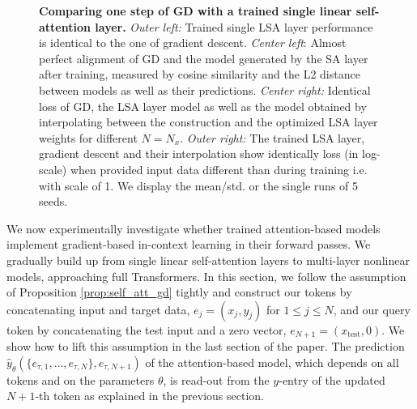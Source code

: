 \documentclass{article}
\theoremstyle{plain}
\theoremstyle{definition}
\theoremstyle{remark}
\begin{document}
\begin{figure}
\begin{minipage}{.23\textwidth}
\begin{center}
  \end{center}
  \vspace{-10pt}
\end{minipage}
\hspace{-0pt}
  \caption{\textbf{Comparing one step of GD with a trained single linear self-attention layer.} \textit{Outer left:} Trained single LSA layer
  performance is identical to the one of gradient descent. 
  \textit{Center left}: Almost perfect alignment of GD and the model generated by the SA layer after training, measured by cosine similarity and the L2 distance between models as well as their predictions. \textit{Center right:} Identical loss of GD, the LSA layer model as well as the model obtained by interpolating between the construction and the optimized LSA layer weights for different $N=N_x$.
  \textit{Outer right:} The trained LSA layer, gradient descent and their interpolation show identically loss (in log-scale) when provided input data different than during training i.e. with scale of 1. We display the mean/std. or the single runs of 5 seeds.}
  \label{fig:training_trans_lin}
   \vspace{-13pt}
\end{figure}

We now experimentally investigate whether trained attention-based models implement gradient-based in-context learning in their forward passes. We gradually build up from single linear self-attention layers to multi-layer nonlinear models, approaching full Transformers. In this section, we follow the assumption of Proposition \ref{prop:self_att_gd} tightly and construct our tokens by concatenating input and target data, $e_j = (x_j, y_j)$ for $1\leq j \leq N$, and our query token by concatenating the test input and a zero vector, $e_{N+1} = (x_{\text{test}}, 0)$. We show how to lift this assumption in the last section of the paper. The prediction $\hat{y}_{\theta}(\{e_{\tau,1}, \ldots, e_{\tau,N}\}, e_{\tau, N+1})$ of the attention-based model, which depends on all tokens and on the parameters $\theta$, is read-out from the $y$-entry of the updated $N+1$-th token as explained in the previous section. 
\end{document}
